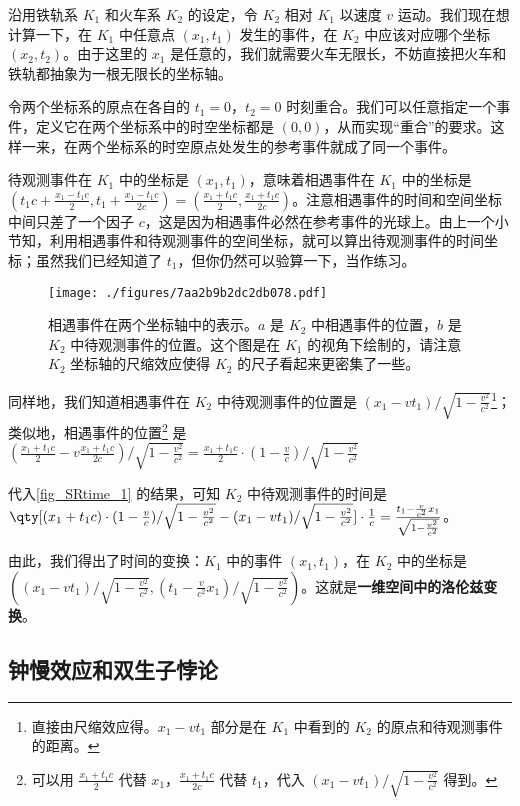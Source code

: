 沿用铁轨系 $K_1$ 和火车系 $K_2$ 的设定，令 $K_2$ 相对 $K_1$ 以速度 $v$ 运动。我们现在想计算一下，在 $K_1$ 中任意点 $(x_1,t_1)$ 发生的事件，在 $K_2$ 中应该对应哪个坐标 $(x_2,t_2)$。由于这里的 $x_1$ 是任意的，我们就需要火车无限长，不妨直接把火车和铁轨都抽象为一根无限长的坐标轴。

令两个坐标系的原点在各自的 $t_1=0$，$t_2=0$ 时刻重合。我们可以任意指定一个事件，定义它在两个坐标系中的时空坐标都是 $(0,0)$，从而实现“重合”的要求。这样一来，在两个坐标系的时空原点处发生的参考事件就成了同一个事件。

待观测事件在 $K_1$ 中的坐标是 $(x_1, t_1)$，意味着相遇事件在 $K_1$ 中的坐标是 $(t_1c+\frac{x_1-t_1c}{2}, t_1+\frac{x_1-t_1c}{2c})=(\frac{x_1+t_1c}{2},\frac{x_1+t_1c}{2c})$。注意相遇事件的时间和空间坐标中间只差了一个因子 $c$，这是因为相遇事件必然在参考事件的光球上。由上一个小节知，利用相遇事件和待观测事件的空间坐标，就可以算出待观测事件的时间坐标；虽然我们已经知道了 $t_1$，但你仍然可以验算一下，当作练习。

\begin{figure}[ht]
\centering
\texttt{[image: ./figures/7aa2b9b2dc2db078.pdf]}
\caption{相遇事件在两个坐标轴中的表示。$a$ 是 $K_2$ 中相遇事件的位置，$b$ 是 $K_2$ 中待观测事件的位置。这个图是在 $K_1$ 的视角下绘制的，请注意 $K_2$ 坐标轴的尺缩效应使得 $K_2$ 的尺子看起来更密集了一些。} \label{fig_SRtime_2}
\end{figure}

同样地，我们知道相遇事件在 $K_2$ 中待观测事件的位置是 $(x_1-vt_1)/\sqrt{1-\frac{v^2}{c^2}}$\footnote{直接由尺缩效应得。$x_1-vt_1$ 部分是在 $K_1$ 中看到的 $K_2$ 的原点和待观测事件的距离。}；类似地，相遇事件的位置\footnote{可以用 $\frac{x_1+t_1c}{2}$ 代替 $x_1$，$\frac{x_1+t_1c}{2c}$ 代替 $t_1$，代入 $(x_1-vt_1)/\sqrt{1-\frac{v^2}{c^2}}$ 得到。}  是 $(\frac{x_1+t_1c}{2}-v\frac{x_1+t_1c}{2c})/\sqrt{1-\frac{v^2}{c^2}}=\frac{x_1+t_1c}{2}\cdot(1-\frac{v}{c})/\sqrt{1-\frac{v^2}{c^2}}$

代入\autoref{fig_SRtime_1} 的结果，可知 $K_2$ 中待观测事件的时间是 $\qty[(x_1+t_1c)\cdot(1-\frac{v}{c})/\sqrt{1-\frac{v^2}{c^2}}-(x_1-vt_1)/\sqrt{1-\frac{v^2}{c^2}}]\cdot \frac{1}{c}=\frac{t_1-\frac{v}{c^2}x_1}{\sqrt{1-\frac{v^2}{c^2}}}$。

由此，我们得出了时间的变换：$K_1$ 中的事件 $(x_1, t_1)$，在 $K_2$ 中的坐标是 $((x_1-vt_1)/\sqrt{1-\frac{v^2}{c^2}}, (t_1-\frac{v}{c^2}x_1)/\sqrt{1-\frac{v^2}{c^2}})$。这就是\textbf{一维空间中的洛伦兹变换}。

\subsection{钟慢效应和双生子悖论}

